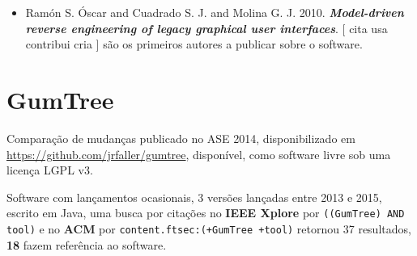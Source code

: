 \begin{itemize}
\item Ram{\'{o}}n S. {\'{O}}scar and Cuadrado S. J. and Molina G. J.
      2010.
        \textbf{\textit{ Model-driven reverse engineering of legacy graphical user interfaces}}.
      [
          cita
          usa
          contribui
          cria
      ]
são os primeiros autores a publicar sobre o software.
\end{itemize}
\section{GumTree}

Comparação de mudanças
publicado no ASE 2014,
disponibilizado em \url{https://github.com/jrfaller/gumtree},
disponível,
como software livre
sob uma licença LGPL v3.

Software com lançamentos ocasionais,
3 versões lançadas
entre 2013 e 2015,
escrito em Java,
uma busca por citações no {\bf IEEE Xplore} por
\texttt{((GumTree) AND tool)}
e no {\bf ACM} por
\texttt{content.ftsec:(+GumTree +tool)}
retornou
37 resultados,
{\bf 18} fazem referência ao software.


